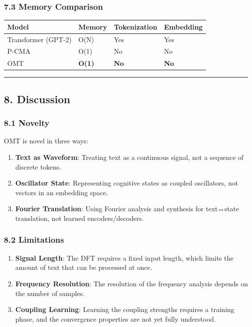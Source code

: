 \documentclass[
  11pt,
  a4paper,
]{article}
\providecommand{\tightlist}{%
  \setlength{\itemsep}{0pt}\setlength{\parskip}{0pt}}
\begin{document}
\subsubsection{7.3 Memory Comparison}\label{memory-comparison}

\begin{longtable}[]{@{}llll@{}}
\toprule\noalign{}
Model & Memory & Tokenization & Embedding \\
\midrule\noalign{}
\endhead
\bottomrule\noalign{}
\endlastfoot
Transformer (GPT-2) & O(N) & Yes & Yes \\
P-CMA & O(1) & No & No \\
OMT & \textbf{O(1)} & \textbf{No} & \textbf{No} \\
\end{longtable}

\begin{center}\rule{0.5\linewidth}{0.5pt}\end{center}

\subsection{8. Discussion}\label{discussion}

\subsubsection{8.1 Novelty}\label{novelty}

OMT is novel in three ways:

\begin{enumerate}
\def\labelenumi{\arabic{enumi}.}
\tightlist
\item
  \textbf{Text as Waveform}: Treating text as a continuous signal, not a
  sequence of discrete tokens.
\item
  \textbf{Oscillator State}: Representing cognitive states as coupled
  oscillators, not vectors in an embedding space.
\item
  \textbf{Fourier Translation}: Using Fourier analysis and synthesis for
  text↔state translation, not learned encoders/decoders.
\end{enumerate}

\subsubsection{8.2 Limitations}\label{limitations}

\begin{enumerate}
\def\labelenumi{\arabic{enumi}.}
\tightlist
\item
  \textbf{Signal Length}: The DFT requires a fixed input length, which
  limits the amount of text that can be processed at once.
\item
  \textbf{Frequency Resolution}: The resolution of the frequency
  analysis depends on the number of samples.
\item
  \textbf{Coupling Learning}: Learning the coupling strengths requires a
  training phase, and the convergence properties are not yet fully
  understood.
\end{enumerate}
\end{document}
